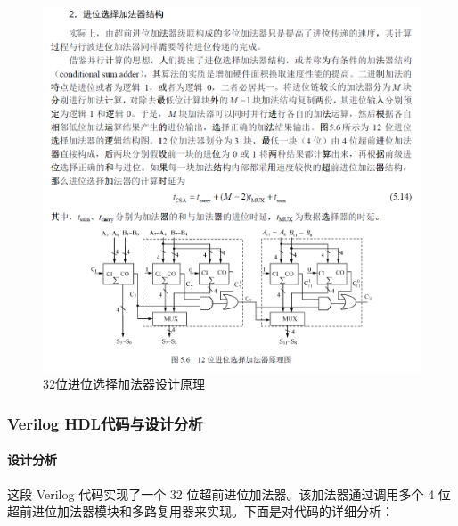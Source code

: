 \documentclass[12pt,hyperref,a4paper,UTF8]{ctexart}
\begin{document}
    \begin{figure}[H]
        \centering
        \includegraphics[width =1.0\textwidth]{figures/fig/Snipaste_2024-09-23_08-54-27.png}
        \caption{32位进位选择加法器设计原理}
        \label{fig:enter-label}
    \end{figure}

\subsubsection{Verilog HDL代码与设计分析}

\paragraph{设计分析}
这段 Verilog 代码实现了一个 32 位超前进位加法器。该加法器通过调用多个 4 位超前进位加法器模块和多路复用器来实现。下面是对代码的详细分析：
\end{document}
